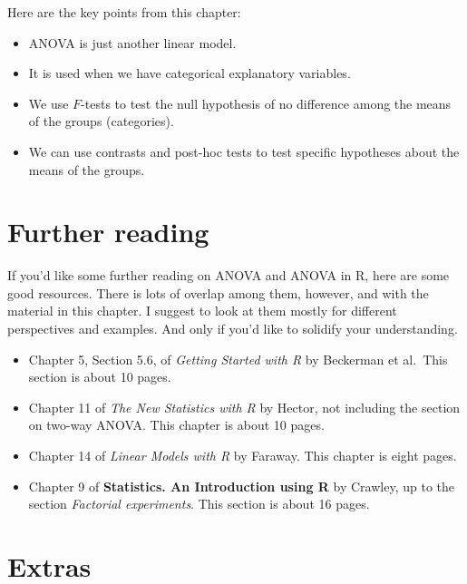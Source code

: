 \documentclass[
  letterpaper,
  8pt,
  a4paper]{book}
\providecommand{\tightlist}{%
  \setlength{\itemsep}{0pt}\setlength{\parskip}{0pt}}
\begin{document}

Here are the key points from this chapter:

\begin{itemize}
\tightlist
\item
  ANOVA is just another linear model.
\item
  It is used when we have categorical explanatory variables.
\item
  We use \(F\)-tests to test the null hypothesis of no difference among
  the means of the groups (categories).
\item
  We can use contrasts and post-hoc tests to test specific hypotheses
  about the means of the groups.
\end{itemize}

\section*{Further reading}\label{further-reading-3}


If you'd like some further reading on ANOVA and ANOVA in R, here are
some good resources. There is lots of overlap among them, however, and
with the material in this chapter. I suggest to look at them mostly for
different perspectives and examples. And only if you'd like to solidify
your understanding.

\begin{itemize}
\tightlist
\item
  Chapter 5, Section 5.6, of \emph{Getting Started with R} by Beckerman
  et al.~This section is about 10 pages.
\item
  Chapter 11 of \emph{The New Statistics with R} by Hector, not
  including the section on two-way ANOVA. This chapter is about 10
  pages.
\item
  Chapter 14 of \emph{Linear Models with R} by Faraway. This chapter is
  eight pages.
\item
  Chapter 9 of \textbf{Statistics. An Introduction using R} by Crawley,
  up to the section \emph{Factorial experiments}. This section is about
  16 pages.
\end{itemize}

\section*{Extras}\label{extras-3}
\end{document}
